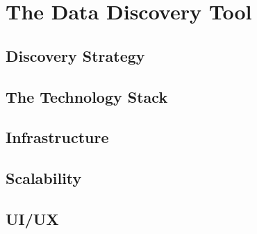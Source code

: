 \chapter{The Data Discovery Tool}\label{ch:ch2label}

\section{Discovery Strategy}

\section{The Technology Stack}

\section{Infrastructure}

\section{Scalability}

\section{UI/UX}